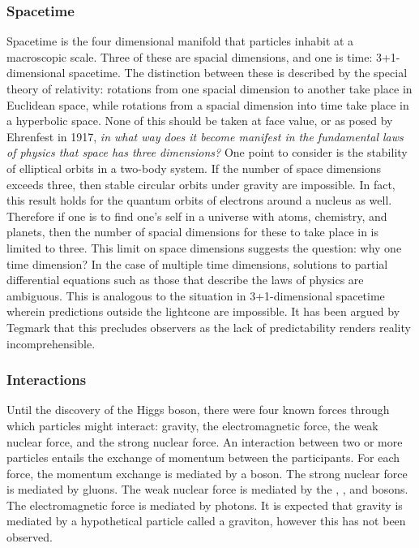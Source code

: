 \subsubsection{Spacetime}

Spacetime is the four dimensional manifold that particles inhabit at a macroscopic scale.
Three of these are spacial dimensions, and one is time: 3+1-dimensional spacetime. 
The distinction between these is described by the special theory of relativity: rotations from one spacial dimension to another take place in Euclidean space, while rotations from a spacial dimension into time take place in a hyperbolic space.
None of this should be taken at face value, or as posed by Ehrenfest in 1917, \emph{in what way does it become manifest in the fundamental laws of physics that space has three dimensions?} 
One point to consider is the stability of elliptical orbits in a two-body system.
If the number of space dimensions exceeds three, then stable circular orbits under gravity are impossible.
In fact, this result holds for the quantum orbits of electrons around a nucleus as well. 
Therefore if one is to find one's self in a universe with atoms, chemistry, and planets, then the number of spacial dimensions for these to take place in is limited to three. \cite{ehrenfest}
This limit on space dimensions suggests the question: why one time dimension?
In the case of multiple time dimensions, solutions to partial differential equations such as those that describe the laws of physics are ambiguous.
This is analogous to the situation in 3+1-dimensional spacetime wherein predictions outside the lightcone are impossible.
It has been argued by Tegmark that this precludes observers as the lack of predictability renders reality incomprehensible.\cite{tegmark-time}


\subsubsection{Interactions}
Until the discovery of the Higgs boson, there were four known forces through which particles might interact: gravity, the electromagnetic force, the weak nuclear force, and the strong nuclear force.
An interaction between two or more particles entails the exchange of momentum between the participants.
For each force, the momentum exchange is mediated by a boson.
The strong nuclear force is mediated by gluons.
The weak nuclear force is mediated by the \Wp, \Wm, and \Z bosons.
The electromagnetic force is mediated by photons.
It is expected that gravity is mediated by a hypothetical particle called a graviton, however this has not been observed.

